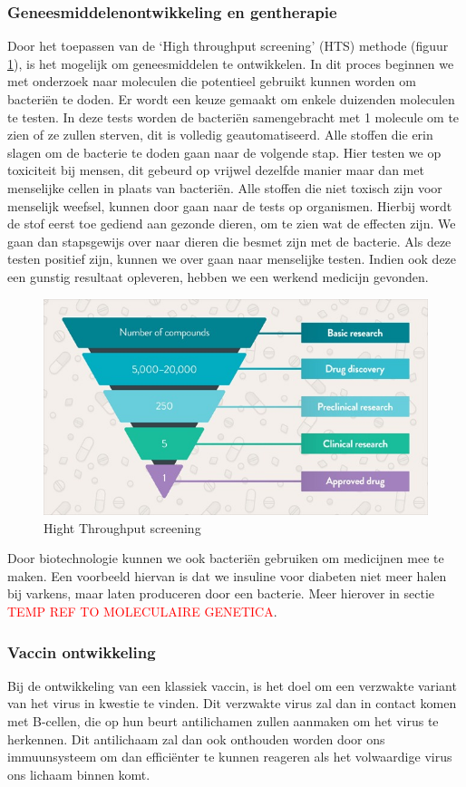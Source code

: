 \documentclass[a4paper,kul]{kulakarticle} %
\begin{document}
\subsubsection{Geneesmiddelenontwikkeling en gentherapie}
Door het toepassen van de `High throughput screening' (HTS) methode (figuur \ref{fig:hts}), is het mogelijk om geneesmiddelen te ontwikkelen. In dit proces beginnen we met onderzoek naar moleculen die potentieel gebruikt kunnen worden om bacteriën te doden. Er wordt een keuze gemaakt om enkele duizenden moleculen te testen. In deze tests worden de bacteriën samengebracht met 1 molecule om te zien of ze zullen sterven, dit is volledig geautomatiseerd. Alle stoffen die erin slagen om de bacterie te doden gaan naar de volgende stap. Hier testen we op toxiciteit bij mensen, dit gebeurd op vrijwel dezelfde manier maar dan met menselijke cellen in plaats van bacteriën. Alle stoffen die niet toxisch zijn voor menselijk weefsel, kunnen door gaan naar de tests op organismen. Hierbij wordt de stof eerst toe gediend aan gezonde dieren, om te zien wat de effecten zijn. We gaan dan stapsgewijs over naar dieren die besmet zijn met de bacterie. Als deze testen positief zijn, kunnen we over gaan naar menselijke testen. Indien ook deze een gunstig resultaat opleveren, hebben we een werkend medicijn gevonden. 
\begin{figure}[h]
	\centering
	\includegraphics[width=0.7\linewidth]{HTS}
	\caption[HTS]{Hight Throughput screening}
	\label{fig:hts}
\end{figure}

Door biotechnologie kunnen we ook bacteriën gebruiken om medicijnen mee te maken. Een voorbeeld hiervan is dat we insuline voor diabeten niet meer halen bij varkens, maar laten produceren door een bacterie. Meer hierover in sectie \textcolor{red}{TEMP REF TO MOLECULAIRE GENETICA}.
\subsubsection{Vaccin ontwikkeling}
Bij de ontwikkeling van een klassiek vaccin, is het doel om een verzwakte variant van het virus in kwestie te vinden. Dit verzwakte virus zal dan in contact komen met B-cellen, die op hun beurt antilichamen zullen aanmaken om het virus te herkennen. Dit antilichaam zal dan ook onthouden worden door ons immuunsysteem om dan efficiënter te kunnen reageren als het volwaardige virus ons lichaam binnen komt. 
\end{document}
